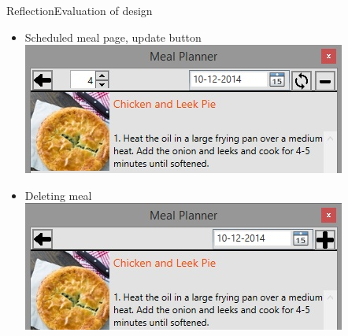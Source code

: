 \begin{frame}{Reflection}{Evaluation of design}
	\begin{itemize}
		\item Scheduled meal page, update button
		\newline \includegraphics[scale=0.4]{./graphics/datepicker}
		\item Deleting meal
		\newline \includegraphics[scale=0.4]{./graphics/datepicker-not-planned}
	\end{itemize}
\end{frame}

